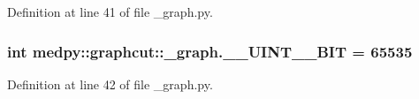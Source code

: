 Definition at line 41 of file \_\-graph.py.

\hypertarget{namespacemedpy_1_1graphcut_1_1__graph_ac21489b41ad253ea1243f8aba21753df}{
\subsubsection[{\_\-\_\-UINT\_\-16\_\-BIT}]{\setlength{\rightskip}{0pt plus 5cm}int {\bf medpy::graphcut::\_\-graph.\_\-\_\-UINT\_\_\-BIT} = 65535}}
\label{namespacemedpy_1_1graphcut_1_1__graph_ac21489b41ad253ea1243f8aba21753df}


Definition at line 42 of file \_\-graph.py.

